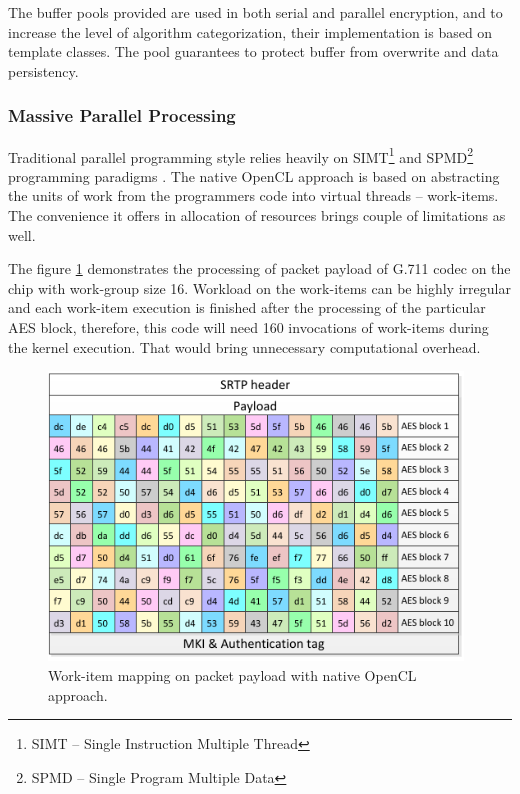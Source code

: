 The buffer pools provided are used in both serial and parallel encryption,
and to increase the level of algorithm categorization, their implementation is
based on template classes. The pool guarantees to protect buffer from overwrite
and data persistency.

\subsubsection*{Massive Parallel Processing}
Traditional parallel programming style relies heavily on SIMT\footnote{ SIMT -- 
Single Instruction Multiple Thread} and SPMD\footnote{ SPMD -- Single Program
Multiple Data} programming paradigms \cite{Flynn:1972}. The native OpenCL 
approach is based on abstracting the units of work from the programmers code 
into virtual threads -- work-items. The convenience it offers in allocation
of resources brings couple of limitations as well. 

The figure \ref{mp_payload} demonstrates the processing of packet payload of 
G.711 codec on the chip with work-group size 16. Workload on the work-items can
be highly irregular and each work-item execution is finished after the 
processing of the particular AES block, therefore, this code will need 160
invocations of work-items during the kernel execution. That would bring
unnecessary computational overhead.    

\begin{figure}[H]
\centering
\includegraphics[width=11cm]{fig/packet_mp.pdf}
\caption[OpenCL work-item mapping]{Work-item mapping on packet payload with 
native OpenCL approach.}
\label{mp_payload}
\end{figure}



